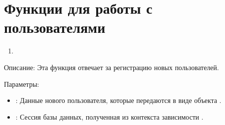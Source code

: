 \documentclass[letterpaper,10pt,russian]{sphinxmanual}
\begin{document}
\sphinxstepscope


\chapter{Функции для работы с пользователями}
\label{\detokenize{src/users/users:id1}}\label{\detokenize{src/users/users::doc}}\begin{enumerate}
%
\item {} 
\sphinxAtStartPar
{}

\end{enumerate}

\sphinxAtStartPar
Описание: Эта функция отвечает за регистрацию новых пользователей.

\sphinxAtStartPar
Параметры:
\begin{itemize}
\item {} 
\sphinxAtStartPar
{}: Данные нового пользователя, которые передаются в виде объекта .

\item {} 
\sphinxAtStartPar
{}: Сессия базы данных, полученная из контекста зависимости .

\end{itemize}
\end{document}
